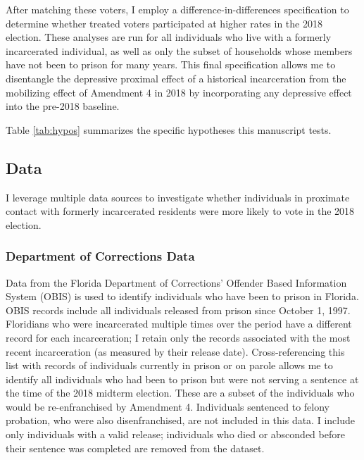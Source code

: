 \documentclass[
  12pt,
]{article}
\begin{document}
After matching these voters, I employ a difference-in-differences specification to determine whether treated voters participated at higher rates in the 2018 election. These analyses are run for all individuals who live with a formerly incarcerated individual, as well as only the subset of households whose members have not been to prison for many years. This final specification allows me to disentangle the depressive proximal effect of a historical incarceration from the mobilizing effect of Amendment 4 in 2018 by incorporating any depressive effect into the pre-2018 baseline.

Table \ref{tab:hypos} summarizes the specific hypotheses this manuscript tests.



\hypertarget{data}{%
\subsection*{Data}\label{data}}

I leverage multiple data sources to investigate whether individuals in proximate contact with formerly incarcerated residents were more likely to vote in the 2018 election.

\hypertarget{department-of-corrections-data}{%
\subsubsection*{Department of Corrections Data}\label{department-of-corrections-data}}

Data from the Florida Department of Corrections' Offender Based Information System (OBIS) is used to identify individuals who have been to prison in Florida. OBIS records include all individuals released from prison since October 1, 1997. Floridians who were incarcerated multiple times over the period have a different record for each incarceration; I retain only the records associated with the most recent incarceration (as measured by their release date). Cross-referencing this list with records of individuals currently in prison or on parole allows me to identify all individuals who had been to prison but were not serving a sentence at the time of the 2018 midterm election. These are a subset of the individuals who would be re-enfranchised by Amendment 4. Individuals sentenced to felony probation, who were also disenfranchised, are not included in this data. I include only individuals with a valid release; individuals who died or absconded before their sentence was completed are removed from the dataset.
\end{document}
